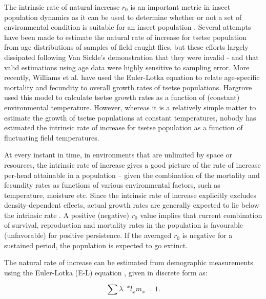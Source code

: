 \documentclass[12pt,a4paper]{article}
\newcommand{\comment}[3]{\textcolor{#1}{\textbf{[#2: }\textsl{#3}\textbf{]}}}
\newcommand{\jd}[1]{\comment{cyan}{JD}{#1}}
\begin{document}
The intrinsic rate of natural increase $r_0$ is an important metric in insect population dynamics as it can be used to determine whether or not a set of environmental condition is suitable for an insect population \cite{Birch1948}. Several attempts have been made to estimate the natural rate of increase for tsetse population from age distributions of samples of field caught flies, but these efforts largely dissipated following Van Sickle’s \cite{VanSickle1988a} demonstration that they were invalid - and that valid estimations using age data were highly sensitive to sampling error. More recently, Williams et al. \cite{williams1990tsetse} have used the Euler-Lotka equation to relate age-specific mortality and fecundity to overall growth rates of tsetse populations. Hargrove \cite{Hargrove2004a}  used this model to calculate tsetse growth rates as a function of (constant) environmental temperature. However, whereas it is a relatively simple matter to estimate the growth of tsetse populations at constant temperatures, nobody has estimated the intrinsic rate of increase for tsetse population as a function of fluctuating field temperatures.

At every instant in time, in environments that are unlimited by space or  resources, the intrinsic rate of increase gives a good picture of the rate of increase per-head  attainable in a population -- given the combination of  the mortality and fecundity rates as functions of various environmental factors, such as temperature, moisture etc. Since the intrinsic rate of increase explicitly excludes density-dependent effects, actual growth rates are generally expected to lie below the intrinsic rate \cite{Birch1948}. A positive (negative) $r_0$ value implies that current combination of survival, reproduction and  mortality rates in the population is favourable (unfavorable) for positive persistence. If the averaged $r_0$ is negative for a sustained period, the population is expected to go extinct.

The natural rate of increase can be estimated from demographic measurements using the Euler-Lotka (E-L) equation \cite{Birch1948,Zidon2015}, given in discrete form as:

\begin{equation}
\label{eulerLotkaEq}
\sum \lambda^{-x}l_{x}m_{x} = 1.
\end{equation}
\end{document}
